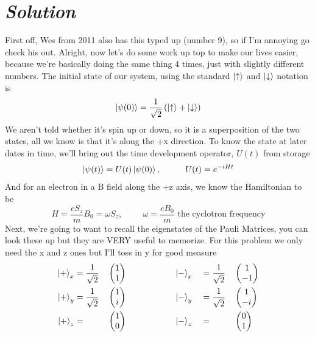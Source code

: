 \documentclass{article}
\begin{document}
\section*{\textit{Solution}} 
First off, Wes from 2011 also has this typed up (number 9), so if I'm annoying go check his out. Alright, now let's do some work up top to make our lives easier, because we're basically doing the same thing 4 times, just with slightly different numbers. The initial state of our system, using the standard $\ket{\uparrow}$ and $\ket{\downarrow}$ notation is
\[ 
	\ket{\psi(0)} = \frac{1}{\sqrt{2}}\left( \ket{\uparrow} + \ket{\downarrow}\right)
\]
We aren't told whether it's spin up or down, so it is a superposition of the two states, all we know is that it's along the +x direction. To know the state at later dates in time, we'll bring out the time development operator, $U(t)$ from storage 
\[
	\ket{\psi(t)} = U(t)\ket{\psi(0)}, \hspace{1cm} U(t) = e^{-iHt}
\]
And for an electron in a B field along the +z axis, we know the Hamiltonian to be 
\[
	H = \frac{eS_z}{m}B_0 = \omega S_z, \hspace{1cm}	\omega = \frac{eB_0}{m} \text{ the cyclotron frequency}
\]
Next, we're going to want to recall the eigenstates of the Pauli Matrices, you can look these up but they are VERY useful to memorize. For this problem we only need the x and z ones but I'll toss in y for good measure
\begin{alignat}{4}
	\ket{+}_x &= \frac{1}{\sqrt{2}} &&\begin{pmatrix} 1 \\ 1 \end{pmatrix} \hspace{2cm} 
		\ket{-}_x &&= \frac{1}{\sqrt{2}} &&\begin{pmatrix} 1 \\ -1 \end{pmatrix} \\ 
	\ket{+}_y &= \frac{1}{\sqrt{2}} &&\begin{pmatrix} 1 \\ i \end{pmatrix} \hspace{2cm} 
		\ket{-}_y &&= \frac{1}{\sqrt{2}} &&\begin{pmatrix} 1 \\ -i \end{pmatrix} \\ 
	\ket{+}_z &= &&\begin{pmatrix} 1 \\ 0 \end{pmatrix} \hspace{2cm} 
		\ket{-}_z &&=  &&\begin{pmatrix} 0 \\ 1 \end{pmatrix} 	
\end{alignat}
\end{document}
